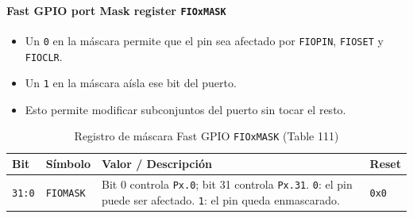 \paragraph{Fast GPIO port Mask register \texttt{FIOxMASK}}
\begin{itemize}
  \item Un \texttt{0} en la máscara permite que el pin sea afectado por \texttt{FIOPIN}, \texttt{FIOSET} y \texttt{FIOCLR}.
  \item Un \texttt{1} en la máscara aísla ese bit del puerto.
  \item Esto permite modificar subconjuntos del puerto sin tocar el resto.
\end{itemize}

\begin{table}[H]
  \centering
  \small
  \caption{Registro de máscara Fast GPIO \texttt{FIOxMASK} (Table 111)}
  \begin{tabularx}{0.96\textwidth}{|>{\centering\arraybackslash}p{}|>{\raggedright\arraybackslash}p{}|>{\raggedright\arraybackslash}X|>{\centering\arraybackslash}p{}|}
    \hline
    \textbf{Bit} & \textbf{Símbolo} & \textbf{Valor / Descripción} & \textbf{Reset} \\
    \hline
    \texttt{31:0} & \texttt{FIOMASK} & Bit 0 controla \texttt{Px.0}; bit 31 controla \texttt{Px.31}. \texttt{0}: el pin puede ser afectado. \texttt{1}: el pin queda enmascarado. & \texttt{0x0} \\
    \hline
  \end{tabularx}
\end{table}

